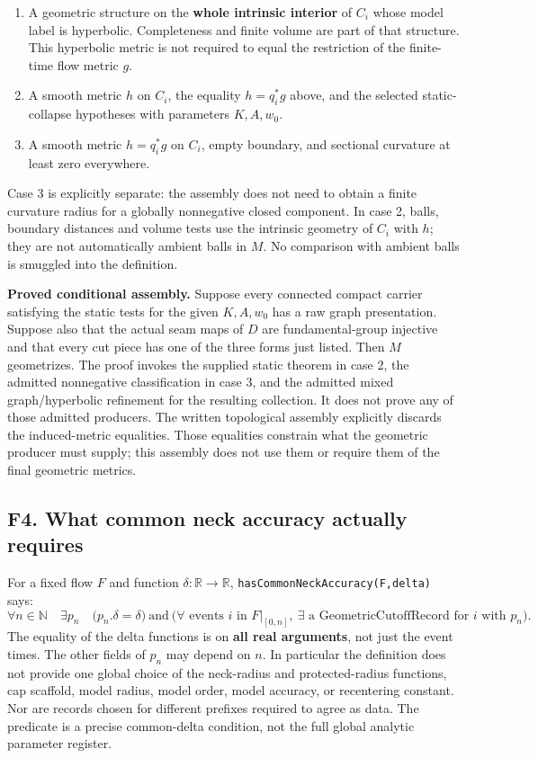 \documentclass[
  letterpaper,
  11pt]{article}
\providecommand{\tightlist}{%
  \setlength{\itemsep}{0pt}\setlength{\parskip}{0pt}}
\begin{document}
\begin{enumerate}
\def\labelenumi{\arabic{enumi}.}
\tightlist
\item
  A geometric structure on the \textbf{whole intrinsic interior} of
  \(C_i\) whose model label is hyperbolic. Completeness and finite
  volume are part of that structure. This hyperbolic metric is not
  required to equal the restriction of the finite-time flow metric
  \(g\).
\item
  A smooth metric \(h\) on \(C_i\), the equality \(h=q_i^*g\) above, and
  the selected static-collapse hypotheses with parameters \(K,A,w_0\).
\item
  A smooth metric \(h=q_i^*g\) on \(C_i\), empty boundary, and sectional
  curvature at least zero everywhere.
\end{enumerate}

Case 3 is explicitly separate: the assembly does not need to obtain a
finite curvature radius for a globally nonnegative closed component. In
case 2, balls, boundary distances and volume tests use the intrinsic
geometry of \(C_i\) with \(h\); they are not automatically ambient balls
in \(M\). No comparison with ambient balls is smuggled into the
definition.

\textbf{Proved conditional assembly.} Suppose every connected compact
carrier satisfying the static tests for the given \(K,A,w_0\) has a raw
graph presentation. Suppose also that the actual seam maps of \(D\) are
fundamental-group injective and that every cut piece has one of the
three forms just listed. Then \(M\) geometrizes. The proof invokes the
supplied static theorem in case 2, the admitted nonnegative
classification in case 3, and the admitted mixed graph/hyperbolic
refinement for the resulting collection. It does not prove any of those
admitted producers. The written topological assembly explicitly discards
the induced-metric equalities. Those equalities constrain what the
geometric producer must supply; this assembly does not use them or
require them of the final geometric metrics.

\subsection{F4. What common neck accuracy actually
requires}\label{f4-common-accuracy}

For a fixed flow \(F\) and function \(\delta:\mathbb R\to\mathbb R\),
{\small\texttt{has\allowbreak{}Common\allowbreak{}Neck\allowbreak{}Accuracy(F,delta)}}
says: \[
 \forall n\in\mathbb N\quad\exists p_n\quad
 \bigl(p_n.\delta=\delta\bigr)\ \text{and}\
 \bigl(\forall\text{ events }i\text{ in }F|_{[0,n]},\
       \exists\text{ a GeometricCutoffRecord for }i\text{ with }p_n\bigr).
\] The equality of the delta functions is on \textbf{all real
arguments}, not just the event times. The other fields of \(p_n\) may
depend on \(n\). In particular the definition does not provide one
global choice of the neck-radius and protected-radius functions, cap
scaffold, model radius, model order, model accuracy, or recentering
constant. Nor are records chosen for different prefixes required to
agree as data. The predicate is a precise common-delta condition, not
the full global analytic parameter register.
\end{document}

